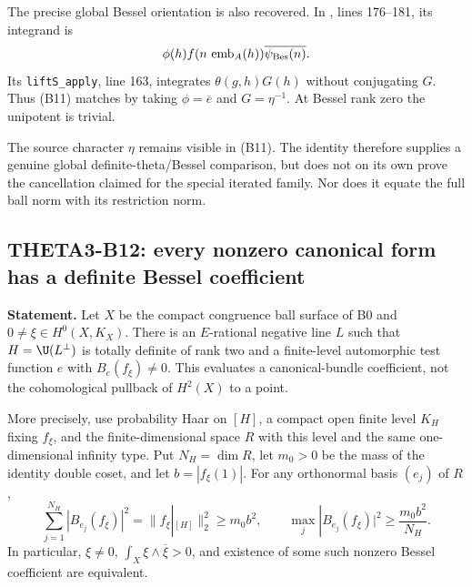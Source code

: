 \documentclass[11pt]{article}
\theoremstyle{definition}\newtheorem{definition}[theorem]{Definition}\newtheorem{remark}[theorem]{Remark}
\begin{document}
The precise global Bessel orientation is also recovered. In
, lines 176--181, its integrand is
\[
 \phi(h)f(n\,\operatorname{emb}_A(h))\overline{\psi_{\rm Bes}(n)}.
\]
Its \texttt{liftS\_apply}, line 163, integrates $\theta(g,h)G(h)$ without conjugating $G$. Thus (B11) matches by taking $\phi=\overline e$ and $G=\eta^{-1}$. At Bessel rank zero the unipotent is trivial.

The source character $\eta$ remains visible in (B11). The identity therefore supplies a genuine global definite-theta/Bessel comparison, but does not on its own prove the cancellation claimed for the special iterated family. Nor does it equate the full ball norm with its restriction norm.

\subsection{THETA3-B12: every nonzero canonical form has a definite Bessel coefficient}\label{B12}

\textbf{Statement.} Let $X$ be the compact congruence ball surface of B0 and $0\ne\xi\in H^0(X,K_X)$. There is an $E$-rational negative line $L$ such that $H=\U(L^\perp)$ is totally definite of rank two and a finite-level automorphic test function $e$ with $B_e(f_\xi)\ne0$. This evaluates a canonical-bundle coefficient, not the cohomological pullback of $H^2(X)$ to a point.

More precisely, use probability Haar on $[H]$, a compact open finite level $K_H$ fixing $f_\xi$, and the finite-dimensional space $R$ with this level and the same one-dimensional infinity type. Put $N_H=\dim R$, let $m_0>0$ be the mass of the identity double coset, and let $b=|f_\xi(1)|$. For any orthonormal basis $(e_j)$ of $R$,
\[
 \sum_{j=1}^{N_H}|B_{e_j}(f_\xi)|^2
      =\|f_\xi|_{[H]}\|_2^2\geq m_0b^2,
 \qquad
 \max_j|B_{e_j}(f_\xi)|^2\geq\frac{m_0b^2}{N_H}.
 \tag{B12}
\]
In particular, $\xi\ne0$, $\int_X\xi\wedge\overline\xi>0$, and existence of some such nonzero Bessel coefficient are equivalent.
\end{document}
